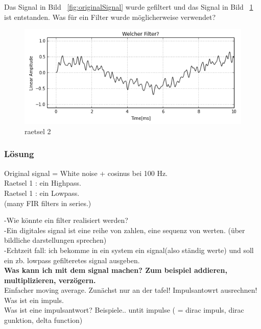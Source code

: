 Das Signal in Bild ~\ref{fig:originalSignal} wurde gefiltert und das Signal in Bild ~\ref{fig:raetsel_2} ist entstanden. Was für ein Filter wurde möglicherweise verwendet?


\begin{figure}[H]
	\begin{center}
		\includegraphics[width = 14cm]{raetsel_lowpass.png}
		\caption{raetsel 2}
		\label{fig:raetsel_2}
	\end{center}
\end{figure}

\newpage
\subsubsection{Lösung} %
\label{sub:l_sung}

Original signal = White noise + cosinus bei 100 Hz.\\
Raetsel 1 : ein Highpass.\\
Raetsel 1 : ein Lowpass.\\
(many FIR filters in series.)





\newpage
-Wie könnte ein filter realisiert werden?\\
-Ein digitales signal ist eine reihe von zahlen, eine sequenz von werten. (über bildliche darstellungen sprechen)\\
-Echtzeit fall: ich bekomme in ein system ein signal(also ständig werte) und soll ein zb. lowpass gefilteretes signal ausgeben.\\
\textbf{Was kann ich mit dem signal machen? Zum beispiel addieren, multiplizieren, verzögern.}\\


Einfacher moving average. Zunächst nur an der tafel!
Impulsantowrt ausrechnen!
Was ist ein impuls.\\
Was ist eine impulsantwort? Beispiele.. untit impulse ( = dirac impuls, dirac gunktion, delta function)\\

